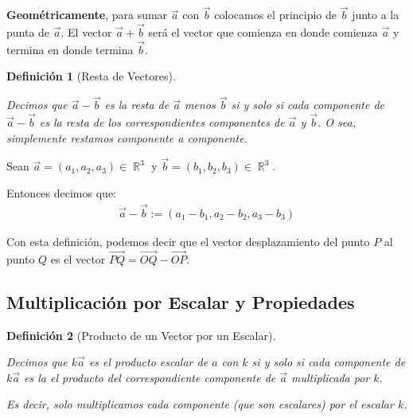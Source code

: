 \documentclass[12pt, fleqn]{report}                             %
\newtheorem{Definition}{Definición}[section]                    %
\theoremstyle{break}                                            %
\DeclareMathOperator \Reals        {\mathbb{R}}                 %
\newcommand{\lVec}[1]{\overrightarrow{#1}}                      %
\begin{document}
                \textbf{Geométricamente}, para sumar $\vec{a}$ con $\vec{b}$ colocamos el principio de
                $\vec{b}$ junto a la punta de $\vec{a}$. El vector $\vec{a} + \vec{b}$ será el vector
                que comienza en donde comienza $\vec{a}$ y termina en donde termina $\vec{b}$.
                
                \vspace{2em}

                \begin{Definition}[Resta de Vectores]
                    \label{DefRestaVectores}

                    Decimos que $\vec{a}-\vec{b}$ es la resta de $\vec{a}$ menos $\vec{b}$ si y solo si 
                    cada componente de $\vec{a}-\vec{b}$ es la resta de los correspondientes componentes
                    de $\vec{a}$ y $\vec{b}$.
                    O sea, simplemente restamos componente a componente.
                    
                \end{Definition}

                Sean $\vec{a} = (a_1, a_2, a_3) \in \Reals^3$ y $\vec{b}=(b_1, b_2, b_3) \in \Reals^3$.

                Entonces decimos que:
                \begin{align}
                    \vec{a} - \vec{b} := (a_1 - b_1, a_2 - b_2, a_3 - b_3)
                \end{align}
            
                Con esta definición, podemos decir que el vector desplazamiento del punto $P$ al punto $Q$
                es el vector $\lVec{PQ} = \lVec{OQ} - \lVec{OP}$.
                
            \clearpage
            \subsection{Multiplicación por Escalar y Propiedades}

                \begin{Definition}[Producto de un Vector por un Escalar]
                    \label{DefProductoVectorEscalar}

                    Decimos que $k \vec{a}$ es el producto escalar de $a$ con $k$
                    si y solo si cada componente de $k \vec{a}$ es la el producto del correspondiente componente
                    de $\vec{a}$ multiplicada por $k$.

                    Es decir, solo multiplicamos cada componente (que son escalares) por el escalar $k$.

                \end{Definition}
\end{document}
